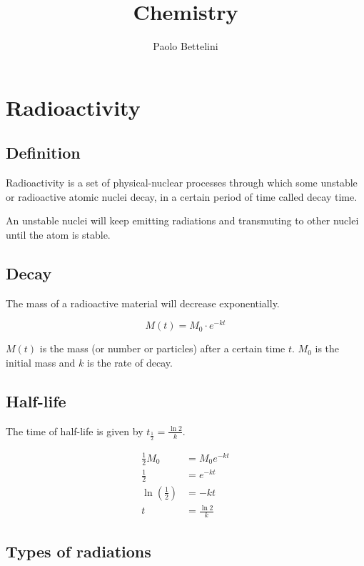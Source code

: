 \documentclass{article}
\title{Chemistry}
\author{Paolo Bettelini}
\date{}
\begin{document}
\maketitle
\tableofcontents

\pagebreak

\section{Radioactivity}

\subsection{Definition}

Radioactivity is a set of physical-nuclear processes
through which some unstable or radioactive atomic nuclei decay,
in a certain period of time called decay time.

An unstable nuclei will keep emitting radiations
and transmuting to other nuclei until the atom is stable.

\subsection{Decay}

The mass of a radioactive material will decrease exponentially.

\[
    M(t) = M_0 \cdot e^{-kt}
\]

\(M(t)\) is the mass (or number or particles)
after a certain time \(t\). \(M_0\) is the initial mass
and \(k\) is the rate of decay.

\subsection{Half-life}

The time of half-life is given by \(t_\frac{1}{2} = \frac{\ln 2}{k}\).

\begin{align*}
    \frac{1}{2}M_0 &= M_0 e^{-kt} \\
    \frac{1}{2} &= e^{-kt} \\
    \ln\left(\frac{1}{2}\right) &= -kt \\
    t &= \frac{\ln 2}{k}
\end{align*}

\subsection{Types of radiations}
\end{document}
